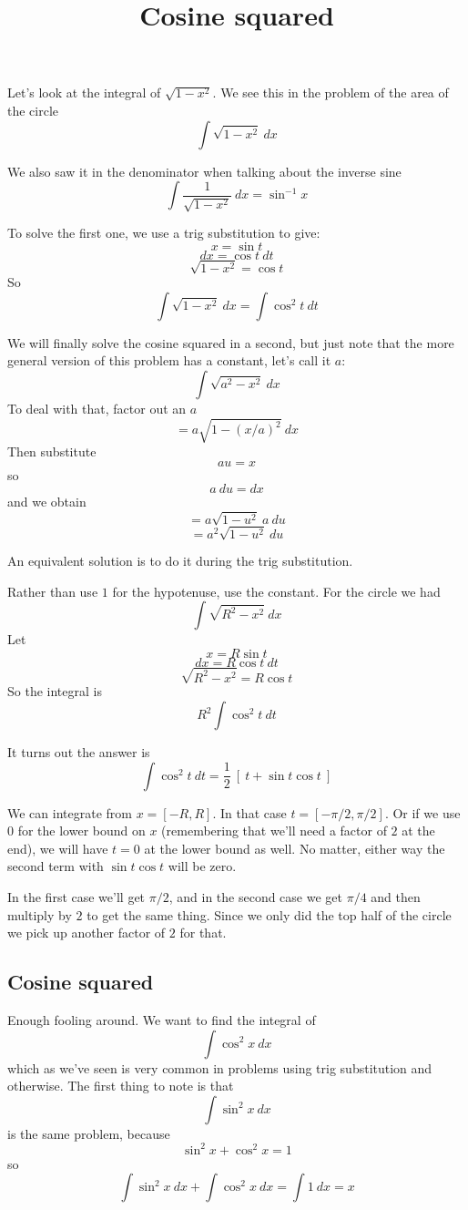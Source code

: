 \documentclass[11pt, oneside]{article}
\title{Cosine squared}
\date{}
\begin{document}
\maketitle
\Large


Let's look at the integral of $\sqrt{1 - x^2}$.  We see this in the problem of the area of the circle
\[ \int \sqrt{1 - x^2} \ dx \]

We also saw it in the denominator when talking about the inverse sine
\[ \int \frac{1}{\sqrt{1 - x^2}} \ dx = \sin^{-1} x \]

To solve the first one, we use a trig substitution to give:
\[ x = \sin t \]
\[ dx = \cos t \ dt \]
\[ \sqrt{1-x^2} = \cos t \]
So
\[ \int \sqrt{1 - x^2} \ dx = \int \cos^2 t \ dt \]

We will finally solve the cosine squared in a second, but just note that the more general version of this problem has a constant, let's call it $a$:
\[ \int \sqrt{a^2 - x^2} \ dx \]
To deal with that, factor out an $a$
\[ = a \sqrt{1 - (x/a)^2} \ dx \]
Then substitute 
\[ au = x \]
 so 
 \[ a \ du = dx \]
 and we obtain
\[ = a \sqrt{1 - u^2} \ a \ du \]
\[ = a^2 \sqrt{1 - u^2}  \ du  \]

An equivalent solution is to do it during the trig substitution.

Rather than use $1$ for the hypotenuse, use the constant.  For the circle we had
\[ \int \sqrt{R^2 - x^2} \ dx \]
Let 
\[ x = R \sin t \]
\[ dx = R \cos t \ dt \]
\[ \sqrt{R^2 - x^2} = R \cos t \]
So the integral is
\[ R^2 \int \cos^2 t \ dt \]

It turns out the answer is 
\[ \int \cos^2 t \ dt = \frac{1}{2} \ [ \ t + \sin t \cos t \ ]  \]

We can integrate from $x = [-R,R]$.  In that case $t = [-\pi/2, \pi/2]$.  Or if we  use $0$ for the lower bound on $x$ (remembering that we'll need a factor of $2$ at the end), we will have $t = 0$ at the lower bound as well.  No matter, either way the second term with $\sin t \cos t$ will be zero.  

In the first case we'll get $\pi/2$, and in the second case we get $\pi/4$ and then multiply by $2$ to get the same thing.  Since we only did the top half of the circle we pick up another factor of $2$ for that.

\subsection*{Cosine squared}
Enough fooling around.  We want to find the integral of
\[ \int \cos^2 x \ dx \]
which as we've seen is very common in problems using trig substitution and otherwise.  The first thing to note is that 
\[ \int \sin^2 x \ dx \]
is the same problem, because
\[ \sin^2 x + \cos^2 x = 1 \]
so 
\[ \int \sin^2 x \ dx + \int \cos^2 x  \ dx = \int 1 \ dx = x \]
\end{document}
